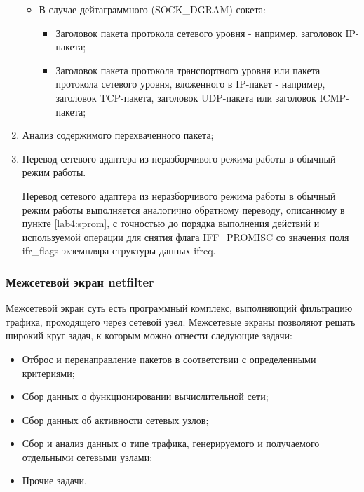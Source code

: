 \begin{enumerate}
\begin{itemize}
\begin{itemize}
					\end{itemize}

				\item В случае дейтаграммного (SOCK\_DGRAM) сокета:

					\begin{itemize}

						\item Заголовок пакета протокола сетевого уровня - например, заголовок IP-пакета;
						\item Заголовок пакета протокола транспортного уровня или пакета протокола сетевого уровня,
						вложенного в IP-пакет - например, заголовок TCP-пакета, заголовок UDP-пакета или заголовок
						ICMP-пакета;

					\end{itemize}

			\end{itemize}

		\item Анализ содержимого перехваченного пакета;
		
		\item Перевод сетевого адаптера из неразборчивого режима работы в обычный режим работы.
		
			Перевод сетевого адаптера из неразборчивого режима работы в обычный режим работы выполняется
			аналогично обратному переводу, описанному в пункте \ref{lab4:sprom}, с точностью до порядка выполнения
			действий и используемой операции для снятия флага IFF\_PROMISC со значения поля ifr\_flags экземпляра
			структуры данных ifreq.

	\end{enumerate}

\subsubsection{Межсетевой экран netfilter}

	Межсетевой экран суть есть программный комплекс, выполняющий фильтрацию трафика, проходящего через сетевой узел.
	Межсетевые экраны позволяют решать широкий круг задач, к которым можно отнести следующие задачи:

	\begin{itemize}

		\item Отброс и перенаправление пакетов в соответствии с определенными критериями;
		\item Сбор данных о функционировании вычислительной сети;
		\item Сбор данных об активности сетевых узлов;
		\item Сбор и анализ данных о типе трафика, генерируемого и получаемого отдельными сетевыми узлами;
		\item Прочие задачи.

	\end{itemize}

